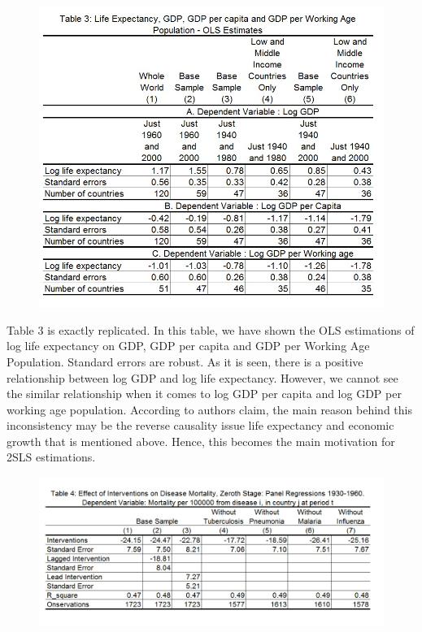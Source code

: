 \documentclass[11pt]{article}
\begin{document}
\begin{figure} [H]
\centering
\includegraphics[width = \textwidth]{table3}
\label{table3}
\end{figure}
Table 3 is exactly replicated. In this table, we have shown the OLS estimations of log life expectancy on GDP, GDP per capita and GDP per Working Age Population. Standard errors are robust. As it is seen, there is a positive relationship between log GDP and log life expectancy. However, we cannot see the similar relationship when it comes to log GDP per capita and log GDP per working age population. According to authors claim, the main reason behind this inconsistency may be the reverse causality issue life expectancy and economic growth that is mentioned above. Hence, this becomes the main motivation for 2SLS estimations. 
\begin{figure} [h!]
\centering
\includegraphics[width=\textwidth]{table4}
\label{table4}
\end{figure}
\end{document}
